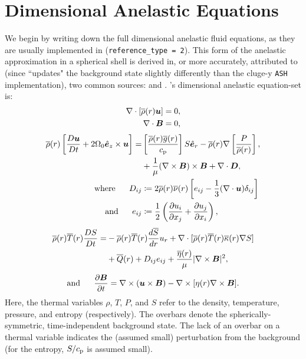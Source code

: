 \documentclass[12pt]{article}
\numberwithin{equation}{section}
\begin{document}
	\section{Dimensional Anelastic Equations}
	We begin by writing down the full dimensional anelastic fluid equations, as they are usually implemented in {\rayleigh} (\texttt{reference\_type = 2}). This form of the anelastic approximation in a spherical shell is derived in, or more accurately, attributed to (since {\rayleigh} ``updates" the background state slightly differently than the cluge-y \texttt{ASH} implementation), two common sources: \citet{Gilman1981} and \citet{Clune1999}. {\rayleigh}'s dimensional anelastic equation-set is:
	\begin{align}
		\nabla\cdot[\overline{\rho}(r)\bm{u}] &= 0\label{eq:contdim},\\
		\nabla\cdot \bm{B} &= 0,
	\end{align}
	\begin{subequations}\label{eq:momdim}
	\begin{align}
		\overline{\rho}(r)\left[\frac{D\bm{u}}{Dt}+2\Omega_0\hat{\bm{e}}_z\times\bm{u}\right] = &  \left[\frac{\overline{\rho}(r) \overline{g}(r)}{c_{\rm{p}}}\right] S\hat{\bm{e}}_r-\overline{\rho}(r)\nabla\left[ \frac{P}{\overline{\rho}(r)} \right], \nonumber\\
		&+ \frac{1}{\mu}(\nabla\times\bm{B})\times\bm{B}+\nabla\cdot\bm{D},\\
		\text{where}\ \ \ \ \  D_{ij} &\coloneqq 2\overline{\rho}(r)\overline{\nu}(r) \left[e_{ij} - \frac{1}{3}(\nabla\cdot\bm{u}) \delta_{ij} \right]\label{eq:dstressdim}\\
		\text{and}\ \ \ \ \  e_{ij} &\coloneqq \frac{1}{2}\left(\frac{\partial u_i}{\partial x_j} + \frac{\partial u_j}{\partial x_i} \right),\label{eq:estressdim}
	\end{align}
	\end{subequations}
	\begin{align}\label{eq:endim}
		\overline{\rho}(r)\overline{T}(r) \frac{DS}{Dt} = &- \overline{\rho}(r)\overline{T}(r) \frac{d\overline{S}}{dr} u_r + \nabla\cdot[\overline{\rho}(r) \overline{T}(r) \overline{\kappa}(r) \nabla S] \nonumber \\
		&+ \overline{Q}(r) + D_{ij}e_{ij} + \frac{\overline{\eta}(r)}{\mu}|\nabla\times\bm{B}|^2,
	\end{align}
	\begin{align}\label{eq:inddim}
	\text{and}\ \ \ \ \  \frac{\partial\bm{B}}{\partial t} = \nabla\times(\bm{u}\times\bm{B}) - \nabla\times[\eta(r)\nabla\times\bm{B}].
	\end{align}
	Here, the thermal variables $\rho$, $T$, $P$, and $S$ refer to the density, temperature, pressure, and entropy (respectively). The overbars denote the spherically-symmetric, time-independent background state. The lack of an overbar on a thermal variable indicates the (assumed small) perturbation from the background (for the entropy, $S/c_{\rm{p}}$ is assumed small).
	
\end{document}
